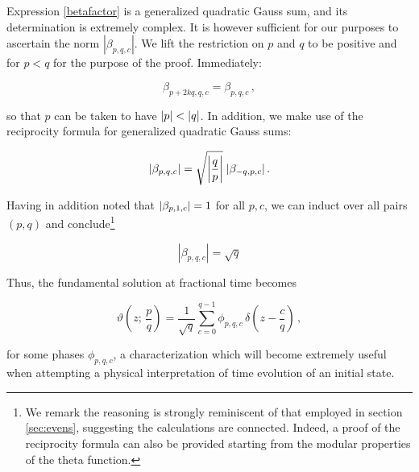 \documentclass{article}
\newcommand{\cmnt}[1]{\textcolor{red}{\emph{#1}}}
\begin{document}
Expression \eqref{betafactor} is a generalized quadratic Gauss sum, and its determination is extremely complex. It is however sufficient for our purposes to ascertain the norm $|\beta_{p,q,c}|$. We lift the restriction on $p$ and $q$ to be positive and for $p<q$ for the purpose of the proof. Immediately:

\begin{equation}
    \beta_{p+2kq,q,c} = \beta_{p,q,c}\,,
\end{equation}

so that $p$ can be taken to have $\abs{p} < \abs{q}$. In addition, we make use of the reciprocity formula for generalized quadratic Gauss sums\cite{berndt_gauss}:

\begin{equation}
    \abs{\beta_{p,q,c}} = \sqrt{\abs{\frac{q}{p}}} \; \abs{\beta_{-q,p,c}}\,.
\end{equation}

Having in addition noted that $\abs{\beta_{p,1,c}} = 1$ for all $p,c$, we can induct over all pairs $(p,q)$ and conclude\footnote{We remark the reasoning is strongly reminiscent of that employed in section \ref{sec:evens}, suggesting the calculations are connected. Indeed, a proof of the reciprocity formula can also be provided starting from the modular properties of the theta function\cite{berndt_gauss}.}

\begin{equation}
    |\beta_{p,q,c}| = \sqrt{q}
\end{equation}

%
%


Thus, the fundamental solution at fractional time becomes

\begin{equation}\label{finalrationalkernel}
    \vartheta\left( z ; \,\frac{p}{q} \right) = \frac{1}{\sqrt{q}} \sum_{c=0}^{q-1} \phi_{p,q,c} \, \delta \left(z-\frac{c}{q}\right)\,,
\end{equation}

for some phases $\phi_{p,q,c}$, a characterization which will become extremely useful when attempting a physical interpretation of time evolution of an initial state.
\end{document}

